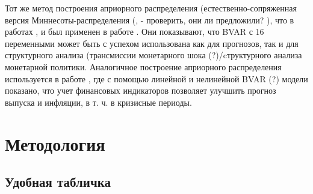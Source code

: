 \documentclass[11pt]{article} %
\begin{document}
Тот же метод построения априорного распределения (естественно-сопряженная версия Миннесоты-распределения (\cite{kadiyala_karlsson_1997},  \cite{sims_zha_1998}- проверить, они ли предложили? ), что в работах \cite{banbura_al_2010} , \cite{bloor_matheson_2010} и \cite{koop_2013} был применен в работе \cite{beauchemin_zaman_2011}. Они показывают, что BVAR с 16 переменными может быть с успехом использована как для прогнозов, так и для структурного анализа (трансмиссии монетарного шока (?)/cтруктурного анализа монетарной политики. Аналогичное построение априорного распределения используется в работе  \cite{alessandri_mumtaz_2014}, где с помощью линейной и нелинейной BVAR (?) модели показано, что учет финансовых индикаторов позволяет улучшить прогноз выпуска и инфляции, в т. ч. в кризисные периоды.





\section{Методология}




\subsection{Удобная табличка}
\end{document}
